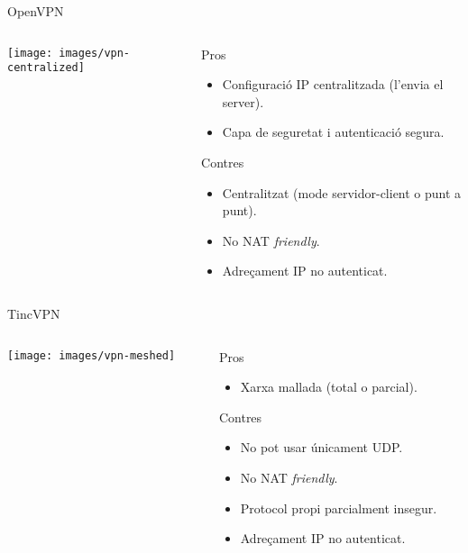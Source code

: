     \begin{frame}{OpenVPN}
        \begin{columns}
        \begin{column}{0.25\textwidth}
        \texttt{[image: images/vpn-centralized]}
        \end{column}
        \begin{column}{0.75\textwidth}
    	\begin{exampleblock}{Pros}\small
		\begin{itemize}
\item Configuració IP centralitzada (l'envia el server).
\item Capa de seguretat i autenticació segura.
		\end{itemize}
	    \end{exampleblock}
	    \begin{alertblock}{Contres}\small
		\begin{itemize}
\item Centralitzat (mode servidor-client o punt a punt).
\item No NAT \emph{friendly}.
\item Adreçament IP no autenticat.
		\end{itemize}
       	\end{alertblock}
        \end{column}
        \end{columns}
    \end{frame}
    \begin{frame}{TincVPN}
        \begin{columns}
        \begin{column}{0.35\textwidth}
        \texttt{[image: images/vpn-meshed]}
        \end{column}
        \begin{column}{0.65\textwidth}
    	\begin{exampleblock}{Pros}\small
		\begin{itemize}
\item Xarxa mallada (total o parcial).
		\end{itemize}
	    \end{exampleblock}
	    \begin{alertblock}{Contres}\small
		\begin{itemize}
\item No pot usar únicament UDP.
\item No NAT \emph{friendly}.
\item Protocol propi parcialment insegur.
\item Adreçament IP no autenticat.
		\end{itemize}
       	\end{alertblock}
        \end{column}
        \end{columns}
    \end{frame}
